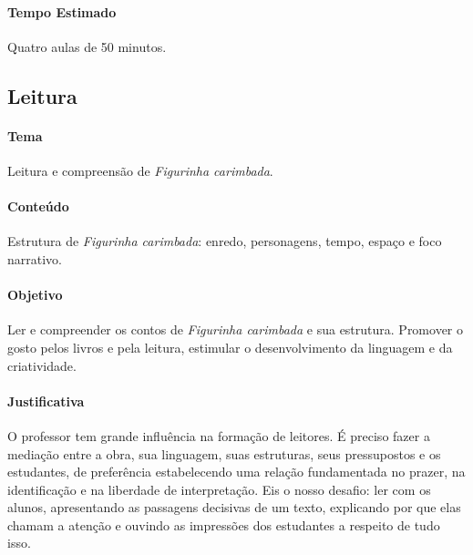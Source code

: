 \documentclass[11pt]{extarticle}
\begin{document}
\paragraph{Tempo Estimado} Quatro aulas de 50 minutos.


\subsection{Leitura}


\paragraph{Tema} Leitura e compreensão de \textit{Figurinha carimbada}.

\paragraph{Conteúdo} Estrutura de \textit{Figurinha carimbada}: enredo, personagens, tempo, espaço e foco narrativo.  

\paragraph{Objetivo} Ler e compreender os contos de \textit{Figurinha carimbada} e sua estrutura. Promover o gosto pelos livros e pela leitura, estimular o desenvolvimento da linguagem e da criatividade.   

\paragraph{Justificativa} O professor tem grande influência na formação de leitores. É preciso fazer a mediação entre a obra, sua linguagem, suas estruturas, seus pressupostos e os estudantes, de preferência estabelecendo uma relação fundamentada no prazer, na identificação e na liberdade de interpretação. Eis o nosso desafio: ler com os alunos, apresentando as passagens decisivas de um texto, explicando por que elas chamam a atenção e  ouvindo as impressões dos estudantes a respeito de tudo isso. 
\end{document}
